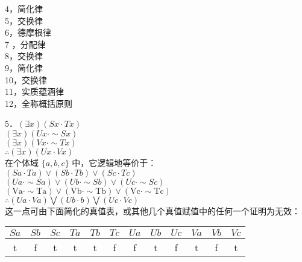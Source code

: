 4，简化律\\
5，交换律\\
6，德摩根律\\
7 ，分配律\\
8，交换律\\
9，简化律\\
10，交换律\\
11，实质蕴涵律\\
12，全称概括原则

5．$(\exists x)(S x \cdot T x)$\\
$(\exists x)(U x \cdot \sim S x)$\\
$(\exists x)(V x \cdot \sim T x)$\\
$\therefore(\exists x)(U x \cdot V x)$\\
在个体域 $\{a, b, c\}$ 中，它逻辑地等价于：\\
$(S a \cdot T a) \vee(S b \cdot T b) \vee(S c \cdot T c)$\\
$(U a \cdot \sim S a) \vee(U b \cdot \sim S b) \vee(U c \cdot \sim S c)$\\
$(\mathrm{Va} \cdot \sim \mathrm{Ta}) \vee(\mathrm{Vb} \cdot \sim \mathrm{Tb}) \vee(\mathrm{Vc} \cdot \sim \mathrm{Tc})$\\
$\therefore(U a \cdot V a) \bigvee(U b \cdot b) \bigvee(U c \cdot V c)$\\
这一点可由下面简化的真值表，或其他几个真值赋值中的任何一个证明为无效：

\begin{center}
\begin{tabular}{cccccccccccc}
$S a$ & $S b$ & $S c$ & $T a$ & $T b$ & $T c$ & $U a$ & $U b$ & $U c$ & $V a$ & $V b$ & $V c$ \\
\hline
t & f & t & t & t & f & f & t & f & t & f & t \\
\hline
\end{tabular}
\end{center}


